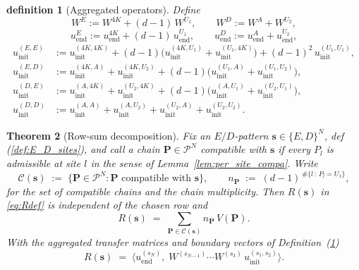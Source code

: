 \documentclass[12pt,a4paper]{article}
\newtheorem{theorem}{Theorem}[section]
\newtheorem{definition}[theorem]{definition}
\begin{document}
\begin{definition}[Aggregated operators]\label{def:row_sum_operators}
Define
\begin{equation}
W^{E} := W^{4K} + (d-1)\,W^{U_1},
\qquad
W^{D} := W^{A} + W^{U_2},
\end{equation}
\begin{equation}
u_\mathrm{end}^{E} := u_\mathrm{end}^{4K} + (d-1)\,u_\mathrm{end}^{U_1},
\qquad
u_\mathrm{end}^{D} := u_\mathrm{end}^{A} + u_\mathrm{end}^{U_2},
\end{equation}
\begin{align}
u_\mathrm{init}^{(E,E)}
&:= u_\mathrm{init}^{(4K,4K)}
   + (d-1)\bigl(u_\mathrm{init}^{(4K,U_1)} + u_\mathrm{init}^{(U_1,4K)}\bigr)
   + (d-1)^2\,u_\mathrm{init}^{(U_1,U_1)},\\[2pt]
u_\mathrm{init}^{(E,D)}
&:= u_\mathrm{init}^{(4K,A)} + u_\mathrm{init}^{(4K,U_2)}
   + (d-1)\bigl(u_\mathrm{init}^{(U_1,A)} + u_\mathrm{init}^{(U_1,U_2)}\bigr),\\[2pt]
u_\mathrm{init}^{(D,E)}
&:= u_\mathrm{init}^{(A,4K)} + u_\mathrm{init}^{(U_2,4K)}
   + (d-1)\bigl(u_\mathrm{init}^{(A,U_1)} + u_\mathrm{init}^{(U_2,U_1)}\bigr),\\[2pt]
u_\mathrm{init}^{(D,D)}
&:= u_\mathrm{init}^{(A,A)} + u_\mathrm{init}^{(A,U_2)}
   + u_\mathrm{init}^{(U_2,A)} + u_\mathrm{init}^{(U_2,U_2)}.
\end{align}

\end{definition}


\begin{theorem}[Row-sum decomposition]\label{thm:row-decomp}
Fix an $E/D$-pattern $\mathbf{s}\in\{E,D\}^N$, def (\ref{def:E_D_sites}), and call a chain $\mathbf{P}\in\mathcal{P}^N$ \emph{compatible} with $\mathbf{s}$ if every $P_l$ is admissible at site $l$ in the sense of Lemma~\ref{lem:per_site_compa}. Write
\[
\mathcal{C}(\mathbf{s}) \;:=\; \{\mathbf{P}\in\mathcal{P}^N : \mathbf{P}\text{ compatible with }\mathbf{s}\},
\qquad
n_{\mathbf{P}} \;:=\; (d-1)^{\,\#\{l\,:\,P_l = U_1\}},
\]
for the set of \emph{compatible chains} and the \emph{chain multiplicity}. Then $R(\mathbf{s})$ in \eqref{eq:Rdef} is independent of the chosen row and
\begin{equation}\label{eq:row-decomp}
R(\mathbf{s}) \;=\; \sum_{\mathbf{P} \in \mathcal{C}(\mathbf{s})} n_{\mathbf{P}}\, V(\mathbf{P}).
\end{equation}
With the aggregated transfer matrices and boundary vectors of Definition~(\ref{def:row_sum_operators})
\begin{equation}\label{eq:row-transfer}
R(\mathbf{s}) \;=\; \bigl\langle u_\mathrm{end}^{(s_N)},\; W^{(s_{N-1})}\cdots W^{(s_3)}\, u_\mathrm{init}^{(s_1,s_2)}\bigr\rangle.
\end{equation}
\end{theorem}
\end{document}
